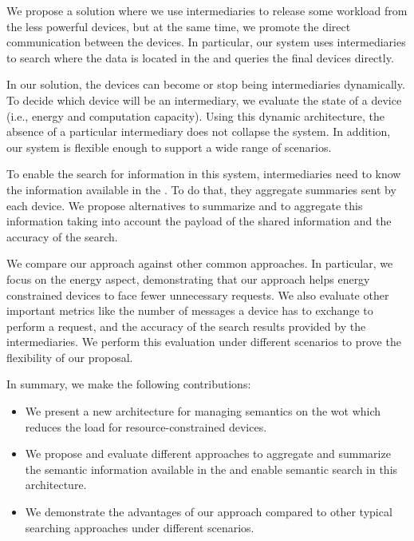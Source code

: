 We propose a solution where we use intermediaries to release some workload from the less powerful devices, but at the same time, we promote the direct communication between the devices.
In particular, our system uses intermediaries to search where the data is located in the \Space{} and queries the final devices directly.

In our solution, the devices can become or stop being intermediaries dynamically.
To decide which device will be an intermediary, we evaluate the state of a device (i.e., energy and computation capacity).
Using this dynamic architecture, the absence of a particular intermediary does not collapse the system.
In addition, our system is flexible enough to support a wide range of scenarios.

To enable the search for information in this system, intermediaries need to know the information available in the \Space{}.
To do that, they aggregate summaries sent by each device.
We propose alternatives to summarize and to aggregate this information taking into account the payload of the shared information and the accuracy of the search.

We compare our approach against other common approaches.
In particular, we focus on the energy aspect, demonstrating that our approach helps energy constrained devices to face fewer unnecessary requests.
We also evaluate other important metrics like the number of messages a device has to exchange to perform a request, and the accuracy of the search results provided by the intermediaries.
We perform this evaluation under different scenarios to prove the flexibility of our proposal.

In summary, we make the following contributions:
\begin{itemize}
\item We present a new architecture for managing semantics on the \ac{wot} which reduces the load for resource-constrained devices.
\item We propose and evaluate different approaches to aggregate and summarize the semantic information available in the \Space{} and enable semantic search in this architecture.
\item We demonstrate the advantages of our approach compared to other typical searching approaches under different scenarios.
\end{itemize}

